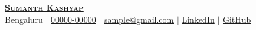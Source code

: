 \documentclass[letterpaper,11pt]{article}
\begin{document}
\begin{center}
    \textbf{\Huge \scshape 
    \href{https://github.com/bheemaguli/resume}{Sumanth Kashyap{\tiny \faLink}}} \\ 
    \vspace{1pt}
    \faMapMarker \hspace{0.2mm} Bengaluru $|$ 
    \faPhone     \hspace{0.2mm} \href{tel:+91-00000-00000}{00000-00000} $|$ 
    \faEnvelope  \hspace{0.2mm} \href{mailto:sample@gmail.com}{sample@gmail.com} $|$ 
    \faLinkedinSquare \hspace{0.2mm} \href{https://www.linkedin.com/in/asdf1234/}{LinkedIn} $|$
    \faGithub    \hspace{0.2mm} \href{https://github.com/bheemaguli/}{GitHub}
\end{center}

\end{document}
